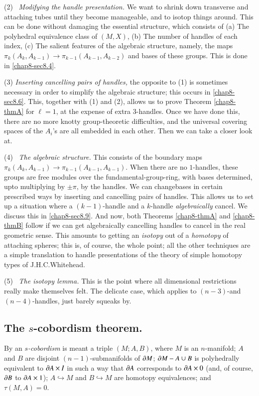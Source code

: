 \medskip
(2)~ {\em Modifying the handle presentation.} We want to shrink down transverse and attaching tubes until they become manageable, and to isotop things around. This can be done without damaging the essential structure, which consists of (a) The polyhedral equivalence class of $(M,X)$, (b) The number of handles of each index, (c) The salient features of the algebraic structure, namely, the maps $\pi_{k}(A_{k},A_{k-1})\to \pi_{k-1}(A_{k-1},A_{k-2})$ and bases of these groups. This is done in \ref{chap8-sec8.4}.

\medskip
(3) {\em Inserting cancelling pairs of handles,} the opposite to (1) is sometimes necessary in order to simplify the algebraic structure; this occurs in \ref{chap8-sec8.6}. This, together with (1) and (2), allows us to prove Theorem \ref{chap8-thmA} for $\ell=1$, at the expense of extra 3-handles. Once we have done this, there are no more knotty group-theoretic difficulties, and the universal covering spaces of the $A_{i}$'s are all embedded in each other. Then we can take a closer look at.

\medskip
(4)~ {\em The algebraic structure.} This consists of the boundary maps $\pi_{k}(A_{k},A_{k-1})\to \pi_{k-1}(A_{k-1},A_{k-1})$. When there are no $1$-handles, these groups are free modules over the fundamental-group-ring, with bases determined, upto multiplying by $\pm \pi$, by the handles. We can change\pageoriginale bases in certain prescribed ways by inserting and cancelling pairs of handles. This allows us to set up a situation where a $(k-1)$-handle and a $k$-handle {\em algebraically} cancel. We discuss this in \ref{chap8-sec8.9}. And now, both Theorems \ref{chap8-thmA} and \ref{chap8-thmB} follow if we can get algebraically cancelling handles to cancel in the real geometric sense. This amounts to getting an {\em isotopy} out of a {\em homotopy} of attaching spheres; this is, of course, the whole point; all the other techniques are a simple translation to handle presentations of the theory of simple homotopy types of J.H.C.\@ Whitehead.


\medskip
(5)~ {\em The isotopy lemma.} This is the point where all dimensional restrictions really make themselves felt. The delicate case, which applies to $(n-3)$-and $(n-4)$-handles, just barely squeaks by.

\subsection{The $s$-cobordism theorem.}\label{chap8-sec8.3.4}
 By an {\em $s$-cobordism} is meant a triple $(M;A,B)$, where $M$ is an $n$-manifold; $A$ and $B$ are disjoint $(n-1)$-submanifolds of $\partial M$; $\partial M-A\cup B$ is polyhedrally equivalent to $\partial A\times I$ in such a way that $\partial A$ corresponds to $\partial A\times 0$ (and, of course, $\partial B$ to $\partial A\times 1$); $A\hookrightarrow M$ and $B\hookrightarrow M$ are homotopy equivalences; and $\tau(M,A)=0$.

